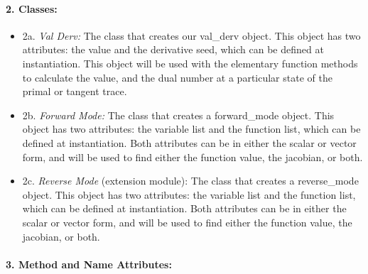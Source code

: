 \documentclass[11pt]{article}
\begin{document}
\hypertarget{classes}{%
\paragraph{\texorpdfstring{2.
\textbf{Classes:}}{2. Classes:}}\label{classes}}

\begin{itemize}
\item
  2a. \emph{Val Derv:} The class that creates our val\_derv object. This
  object has two attributes: the value and the derivative seed, which
  can be defined at instantiation. This object will be used with the
  elementary function methods to calculate the value, and the dual
  number at a particular state of the primal or tangent trace.
\item
  2b. \emph{Forward Mode:} The class that creates a forward\_mode
  object. This object has two attributes: the variable list and the
  function list, which can be defined at instantiation. Both attributes
  can be in either the scalar or vector form, and will be used to find
  either the function value, the jacobian, or both.
\item
  2c. \emph{Reverse Mode} (extension module): The class that creates a
  reverse\_mode object. This object has two attributes: the variable
  list and the function list, which can be defined at instantiation.
  Both attributes can be in either the scalar or vector form, and will
  be used to find either the function value, the jacobian, or both.
\end{itemize}

\hypertarget{method-and-name-attributes}{%
\paragraph{\texorpdfstring{3. \textbf{Method and Name
Attributes:}}{3. Method and Name Attributes:}}\label{method-and-name-attributes}}
\end{document}
